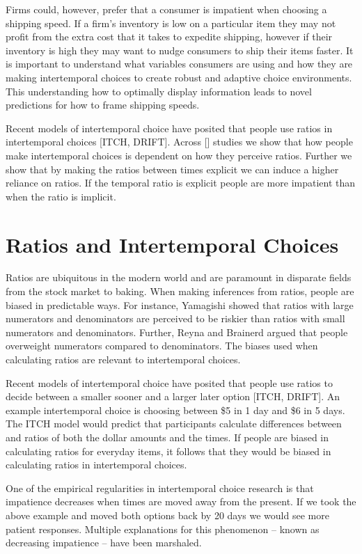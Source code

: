 \documentclass[]{article}
\begin{document}
Firms could, however, prefer that a consumer is impatient when choosing a shipping speed. 
If a firm's inventory is low on a particular item they may not profit from the extra cost that it takes to expedite shipping, however if their inventory is high they may want to nudge consumers to ship their items faster. 
It is important to understand what variables consumers are using and how they are making intertemporal choices to create robust and adaptive choice environments. 
This understanding how to optimally display information leads to novel predictions for how to frame shipping speeds. 

Recent models of intertemporal choice have posited that people use ratios in intertemporal choices [ITCH, DRIFT]. 
Across [] studies we show that how people make intertemporal choices is dependent on how they perceive ratios. 
Further we show that by making the ratios between times explicit we can induce a higher reliance on ratios. 
If the temporal ratio is explicit people are more impatient than when the ratio is implicit.

\section{Ratios and Intertemporal Choices}

Ratios are ubiquitous in the modern world and are paramount in disparate fields from the stock market to baking. 
When making inferences from ratios, people are biased in predictable ways.
For instance, Yamagishi showed that ratios with large numerators and denominators are perceived to be riskier than ratios with small numerators and denominators. Further, Reyna and Brainerd argued that people overweight numerators compared to denominators.
The biases used when calculating ratios are relevant to intertemporal choices. 

Recent models of intertemporal choice have posited that people use ratios to decide between a smaller sooner and a larger later option [ITCH, DRIFT]. 
An example intertemporal choice is choosing between \$5 in 1 day and \$6 in 5 days. 
The ITCH model would predict that participants calculate differences between and ratios of both the dollar amounts and the times. 
If people are biased in calculating ratios for everyday items, it follows that they would be biased in calculating ratios in intertemporal choices. 

One of the empirical regularities in intertemporal choice research is that impatience decreases when times are moved away from the present.
If we took the above example and moved both options back by 20 days we would see more patient responses. 
Multiple explanations for this phenomenon -- known as decreasing impatience -- have been marshaled. 
\end{document}
